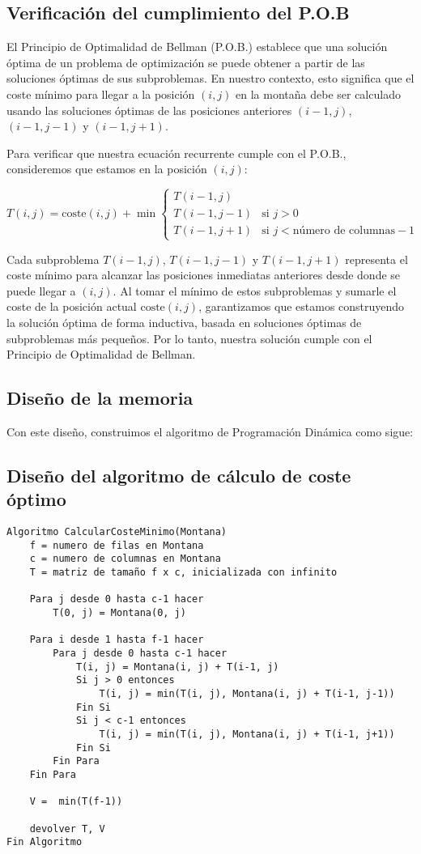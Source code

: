 \subsection{Verificación del cumplimiento del P.O.B}

El Principio de Optimalidad de Bellman (P.O.B.) establece que una solución óptima de un problema de optimización se puede obtener a partir de las soluciones óptimas de sus subproblemas. En nuestro contexto, esto significa que el coste mínimo para llegar a la posición $(i, j)$ en la montaña debe ser calculado usando las soluciones óptimas de las posiciones anteriores $(i-1, j)$, $(i-1, j-1)$ y $(i-1, j+1)$. 

Para verificar que nuestra ecuación recurrente cumple con el P.O.B., consideremos que estamos en la posición $(i, j)$:

\[
T(i, j) = \text{coste}(i, j) + \min \begin{cases} 
T(i-1, j) \\
T(i-1, j-1) & \text{si } j > 0 \\
T(i-1, j+1) & \text{si } j < \text{número de columnas} - 1 
\end{cases}
\]

Cada subproblema $T(i-1, j)$, $T(i-1, j-1)$ y $T(i-1, j+1)$ representa el coste mínimo para alcanzar las posiciones inmediatas anteriores desde donde se puede llegar a $(i, j)$. Al tomar el mínimo de estos subproblemas y sumarle el coste de la posición actual $\text{coste}(i, j)$, garantizamos que estamos construyendo la solución óptima de forma inductiva, basada en soluciones óptimas de subproblemas más pequeños. Por lo tanto, nuestra solución cumple con el Principio de Optimalidad de Bellman.


\subsection{Diseño de la memoria}
Con este diseño, construimos el algoritmo de Programación Dinámica como sigue:


\subsection{Diseño del algoritmo de cálculo de coste óptimo}
\begin{lstlisting}
Algoritmo CalcularCosteMinimo(Montana)
    f = numero de filas en Montana
    c = numero de columnas en Montana
    T = matriz de tamaño f x c, inicializada con infinito

    Para j desde 0 hasta c-1 hacer
        T(0, j) = Montana(0, j)

    Para i desde 1 hasta f-1 hacer
        Para j desde 0 hasta c-1 hacer
            T(i, j) = Montana(i, j) + T(i-1, j)
            Si j > 0 entonces
                T(i, j) = min(T(i, j), Montana(i, j) + T(i-1, j-1))
            Fin Si
            Si j < c-1 entonces
                T(i, j) = min(T(i, j), Montana(i, j) + T(i-1, j+1))
            Fin Si
        Fin Para
    Fin Para

    V =  min(T(f-1))
    
    devolver T, V
Fin Algoritmo
\end{lstlisting}

